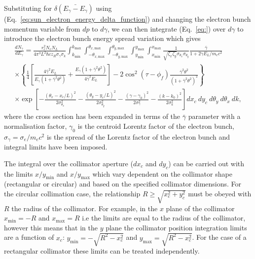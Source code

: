 \documentclass[../main.tex]{subfiles}
\begin{document}
Substituting for $\delta\left(\bar{E_{\gamma}-E_{\gamma}}\right)$ using (Eq.~\ref{eq:sun_electron_energy_delta_function}) and changing the electron bunch momentum variable from $dp$ to $d\gamma$, we can then integrate (Eq.~\ref{eq:}) over $d\gamma$ to introduce the electron bunch energy spread variation which gives
\begin{multline}
\frac{dN_{\gamma}}{dE_{\gamma}} = \frac{r_{e}^{2}N_{e}N_{L}}{4\pi^{3}L^{2}\hbar c z_{R}\sigma_{\gamma}\sigma_{k}}\int_{k_{\mathrm{min}}}^{k_{\mathrm{max}}}\int_{-\theta_{x,\mathrm{max}}}^{\theta_{x,\mathrm{max}}}\int_{-\theta_{y,\mathrm{max}}}^{\theta_{y,\mathrm{max}}}\int_{y_{\mathrm{min}}}^{y_{\mathrm{max}}}\int_{x_{\mathrm{min}}}^{x_{\mathrm{max}}}\frac{1}{\sqrt{\zeta_{x}\zeta_{y}}\sigma_{\theta_{x}}\sigma_{\theta_{y}}}\frac{\bar{\gamma}}{1+2\gamma E_{L}/m_{e}c^{2}} \\
\times\left\{\frac{1}{4}\left[\frac{4\bar{\gamma}^{2}E_{L}}{E_{\gamma}\left(1+\bar{\gamma}^{2}\theta^{2}\right)}+\frac{E_{\gamma}\left(1+\bar{\gamma}^{2}\theta^{2}\right)}{4\bar{\gamma}^{2}E_{L}}\right]-2\cos^{2}\left(\tau-\phi_{f}\right)\frac{\bar{\gamma}^{2}\theta^{2}}{\left(1+\bar{\gamma}^{2}\theta^{2}\right)^{2}}\right\} \\
\times\exp{\left[-\frac{\left(\theta_{x}-x_{c}/L\right)^{2}}{2\sigma_{\theta_{x}}^{2}}-\frac{\left(\theta_{y}-y_{c}/L\right)^{2}}{2\sigma_{\theta_{y}}^{2}}-\frac{\left(\gamma-\gamma_{0}\right)^{2}}{2\sigma_{\gamma}^{2}}-\frac{\left(k-k_{0}\right)^{2}}{2\sigma_{k}^{2}}\right]}dx_{c}~dy_{c}~d\theta_{y}~d\theta_{x}~dk,
\label{eq:ICARUS_equation}
\end{multline}
where the cross section has been expanded in terms of the $\bar{\gamma}$ parameter with a normalisation factor, $\gamma_{0}$ is the centroid Lorentz factor of the electron bunch, $\sigma_{\gamma} = \sigma_{e}/m_{e}c^{2}$ is the spread of the Lorentz factor of the electron bunch and integral limits have been imposed. 

The integral over the collimator aperture ($dx_{c}$ and $dy_{c}$) can be carried out with the limits $x/y_{\mathrm{min}}$ and $x/y_{\mathrm{max}}$ which vary dependent on the collimator shape (rectangular or circular) and based on the specified collimator dimensions. For the circular collimation case, the relationship $R\geq\sqrt{x_{c}^{2}+y_{c}^{2}}$ must be obeyed with $R$ the radius of the collimator. For example, in the $x$ plane of the collimator $x_{\mathrm{min}} = -R$ and $x_{\mathrm{max}} = R$ i.e the limits are equal to the radius of the collimator, however this means that in the $y$ plane the collimator position integration limits are a function of $x_{c}$: $y_{\mathrm{min}} = -\sqrt{R^{2}-x_{c}^{2}}$ and $y_{\mathrm{max}} = \sqrt{R^{2}-x_{c}^{2}}$. For the case of a rectangular collimator these limits can be treated independently.  
\end{document}
